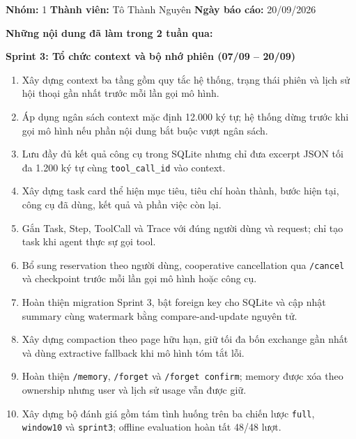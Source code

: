 \documentclass[12pt,a4paper]{article}
\begin{document}
\textbf{Nhóm:} 1
\hfill
\textbf{Thành viên:} Tô Thành Nguyên
\hfill
\textbf{Ngày báo cáo:} 20/09/2026

\vspace{1em}

\textbf{Những nội dung đã làm trong 2 tuần qua:}

\textbf{Sprint 3: Tổ chức context và bộ nhớ phiên (07/09 -- 20/09)}

\begin{enumerate}
    \item Xây dựng context ba tầng gồm quy tắc hệ thống, trạng thái phiên và lịch sử hội thoại gần nhất trước mỗi lần gọi mô hình.

    \item Áp dụng ngân sách context mặc định 12.000 ký tự; hệ thống dừng trước khi gọi mô hình nếu phần nội dung bắt buộc vượt ngân sách.

    \item Lưu đầy đủ kết quả công cụ trong SQLite nhưng chỉ đưa excerpt JSON tối đa 1.200 ký tự cùng \texttt{tool\_call\_id} vào context.

    \item Xây dựng task card thể hiện mục tiêu, tiêu chí hoàn thành, bước hiện tại, công cụ đã dùng, kết quả và phần việc còn lại.

    \item Gắn Task, Step, ToolCall và Trace với đúng người dùng và request; chỉ tạo task khi agent thực sự gọi tool.

    \item Bổ sung reservation theo người dùng, cooperative cancellation qua \texttt{/cancel} và checkpoint trước mỗi lần gọi mô hình hoặc công cụ.

    \item Hoàn thiện migration Sprint 3, bật foreign key cho SQLite và cập nhật summary cùng watermark bằng compare-and-update nguyên tử.

    \item Xây dựng compaction theo page hữu hạn, giữ tối đa bốn exchange gần nhất và dùng extractive fallback khi mô hình tóm tắt lỗi.

    \item Hoàn thiện \texttt{/memory}, \texttt{/forget} và \texttt{/forget confirm}; memory được xóa theo ownership nhưng user và lịch sử usage vẫn được giữ.

    \item Xây dựng bộ đánh giá gồm tám tình huống trên ba chiến lược \texttt{full}, \texttt{window10} và \texttt{sprint3}; offline evaluation hoàn tất 48/48 lượt.


\end{enumerate}
\end{document}
